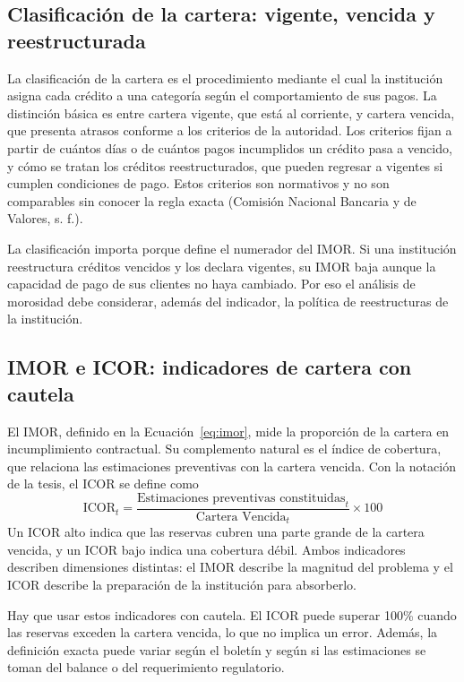 \subsection{Clasificación de la cartera: vigente, vencida y reestructurada}
La clasificación de la cartera es el procedimiento mediante el cual la institución asigna cada crédito a una categoría según el comportamiento de sus pagos. La distinción básica es entre cartera vigente, que está al corriente, y cartera vencida, que presenta atrasos conforme a los criterios de la autoridad. Los criterios fijan a partir de cuántos días o de cuántos pagos incumplidos un crédito pasa a vencido, y cómo se tratan los créditos reestructurados, que pueden regresar a vigentes si cumplen condiciones de pago. Estos criterios son normativos y no son comparables sin conocer la regla exacta (Comisión Nacional Bancaria y de Valores, s. f.).

La clasificación importa porque define el numerador del IMOR. Si una institución reestructura créditos vencidos y los declara vigentes, su IMOR baja aunque la capacidad de pago de sus clientes no haya cambiado. Por eso el análisis de morosidad debe considerar, además del indicador, la política de reestructuras de la institución. %

\subsection{IMOR e ICOR: indicadores de cartera con cautela}
El IMOR, definido en la Ecuación~\eqref{eq:imor}, mide la proporción de la cartera en incumplimiento contractual. Su complemento natural es el índice de cobertura, que relaciona las estimaciones preventivas con la cartera vencida. Con la notación de la tesis, el ICOR se define como
\begin{equation}
\text{ICOR}_t=\frac{\text{Estimaciones preventivas constituidas}_t}{\text{Cartera Vencida}_t}\times 100
\label{eq:icor}
\end{equation}
Un ICOR alto indica que las reservas cubren una parte grande de la cartera vencida, y un ICOR bajo indica una cobertura débil. Ambos indicadores describen dimensiones distintas: el IMOR describe la magnitud del problema y el ICOR describe la preparación de la institución para absorberlo.

Hay que usar estos indicadores con cautela. El ICOR puede superar 100\% cuando las reservas exceden la cartera vencida, lo que no implica un error. Además, la definición exacta puede variar según el boletín y según si las estimaciones se toman del balance o del requerimiento regulatorio. %

